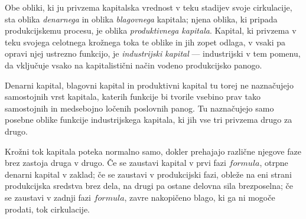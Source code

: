 \documentclass[kapital_02.tex]{subfiles}
\begin{document}
Obe obliki, ki ju privzema kapitalska vrednost v teku stadijev svoje cirkulacije, sta oblika \emph{denarnega} in oblika \emph{blagovnega} kapitala; njena oblika, ki pripada produkcijskemu procesu, je oblika \emph{produktivnega kapitala}. Kapital, ki privzema v teku svojega celotnega krožnega toka te oblike in jih zopet odlaga, v vsaki pa opravi njej ustrezno funkcijo, je \emph{industrijski kapital} --- industrijski v tem pomenu, da vključuje vsako na kapitalistični način vodeno produkcijsko panogo.

Denarni kapital, blagovni kapital in produktivni kapital tu torej ne naznačujejo samostojnih vrst kapitala, katerih funkcije bi tvorile vsebino prav tako samostojnih in medsebojno ločenih poslovnih panog. Tu naznačujejo samo posebne oblike funkcije industrijskega kapitala, ki jih vse tri privzema drugo za drugo.

Krožni tok kapitala poteka normalno samo, dokler prehajajo različne njegove faze brez zastoja druga v drugo. Če se zaustavi kapital v prvi fazi \( formula \), otrpne denarni kapital v zaklad; če se zaustavi v produkcijski fazi, obleže na eni strani produkcijska sredstva brez dela, na drugi pa ostane delovna sila brezposelna; če se zaustavi v zadnji fazi \( formula \), zavre nakopičeno blago, ki ga ni mogoče prodati, tok cirkulacije.
\end{document}
